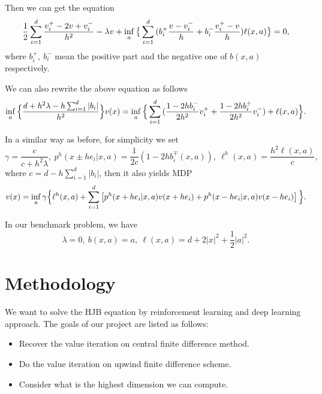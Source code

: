 \documentclass[12pt]{article}
\begin{document}
Then we can get the equation
$$\frac{1}{2}\sum_{i=1}^d{\frac{v_i^+ -2v + v_i^-}{h^2}} - \lambda v + \inf_{a} \big{\{} \sum_{i=1}^d { (b_i^+ \frac{v - v_i^-}{h} + b_i^- \frac{v_i^+ - v}{h}) } \ell(x,a) \big{\}} = 0, $$
where $b_i^+,\ b_i^-$ mean the positive part and the negative one of $b(x,a)$ respectively.

We can also rewrite the above equation as follows
$$ \inf_{a} \Big{\{} \frac{d+h^2 \lambda - h \sum_{i=1}^d |b_i|}{h^2} \Big{\}} v(x) = \inf_{a} \Big{\{} \sum_{i=1}^d { (\frac{1 - 2h b_i^-}{2h^2} v_i^+ + \frac{1 - 2h b_i^+}{2h^2} v_i^-) } + \ell(x,a) \Big{\}}. $$

In a similar way as before, for simplicity we set
$$\gamma = \frac{c}{c + h^2 \lambda},\ p^h(x \pm he_i|x,a) = \frac{1}{2c}(1 - 2 h b_i^{\mp}(x,a)),\ \ell ^ h (x,a) = \frac{h^2 \ell (x,a)}{c}, $$
where $c = d - h\sum_{i=1}^d |b_i|$, then it also yields MDP
$$v(x) =  \inf_{a} \gamma \Big{\{}\ell^h (x,a) + \sum_{i=1}^d \left[ p^h(x + he_i|x,a) v(x+he_i) + p^h(x - he_i|x,a) v(x-he_i) \right] \Big{\}}. $$

In our benchmark problem, we have 
$$\lambda = 0,\ b(x,a) = a,\ \ell (x,a) = d + 2 |x|^{2} + \frac{1}{2} |a|^{2}.$$

\section{Methodology}

We want to solve the HJB equation by reinforcement learning and deep learning approach. The goals of our project are listed as follows:
\begin{itemize}
    \item Recover the value iteration on central finite difference method.
    \item Do the value iteration on upwind finite difference scheme.
    \item Consider what is the highest dimension we can compute.
\end{itemize} 
\end{document}
